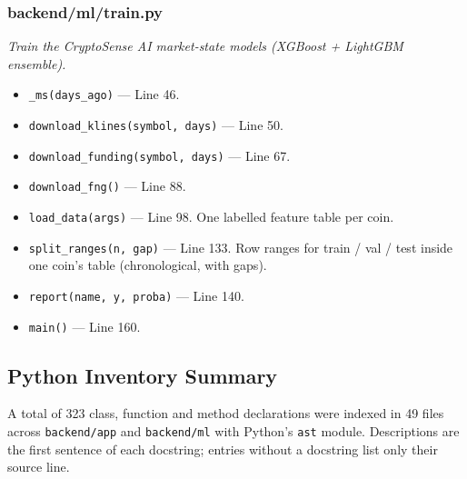 \subsubsection*{backend/ml/train.py}
\textit{Train the CryptoSense AI market-state models (XGBoost + LightGBM ensemble).}
\begin{itemize}[nosep,leftmargin=1.5em]
\item \texttt{\_\allowbreak{}ms(\allowbreak{}days\_\allowbreak{}ago)} --- Line 46.
\item \texttt{download\_\allowbreak{}klines(\allowbreak{}symbol,\allowbreak{} days)} --- Line 50.
\item \texttt{download\_\allowbreak{}funding(\allowbreak{}symbol,\allowbreak{} days)} --- Line 67.
\item \texttt{download\_\allowbreak{}fng(\allowbreak{})} --- Line 88.
\item \texttt{load\_\allowbreak{}data(\allowbreak{}args)} --- Line 98. One labelled feature table per coin.
\item \texttt{split\_\allowbreak{}ranges(\allowbreak{}n,\allowbreak{} gap)} --- Line 133. Row ranges for train / val / test inside one coin's table (chronological, with gaps).
\item \texttt{report(\allowbreak{}name,\allowbreak{} y,\allowbreak{} proba)} --- Line 140.
\item \texttt{main(\allowbreak{})} --- Line 160.
\end{itemize}
\subsection{Python Inventory Summary}
A total of 323 class, function and method declarations were indexed in 49 files across \texttt{backend/app} and \texttt{backend/ml} with Python's \texttt{ast} module. Descriptions are the first sentence of each docstring; entries without a docstring list only their source line.
